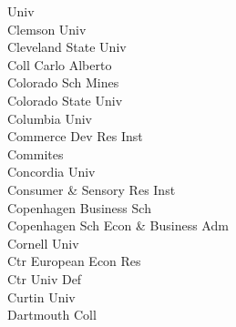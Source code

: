 \documentclass[a4paper]{article}
\begin{document}
\begin{multicols*}{2}
\begin{footnotesize}
 Univ \\ Clemson Univ \\ Cleveland State Univ \\ Coll Carlo Alberto \\ Colorado Sch Mines \\ Colorado State Univ \\ Columbia Univ \\ Commerce Dev Res Inst \\ Commites \\ Concordia Univ \\ Consumer \& Sensory Res Inst \\ Copenhagen Business Sch \\ Copenhagen Sch Econ \& Business Adm \\ Cornell Univ \\ Ctr European Econ Res \\ Ctr Univ Def \\ Curtin Univ \\ Dartmouth Coll 
\end{footnotesize}
\end{multicols*}
\end{document}
